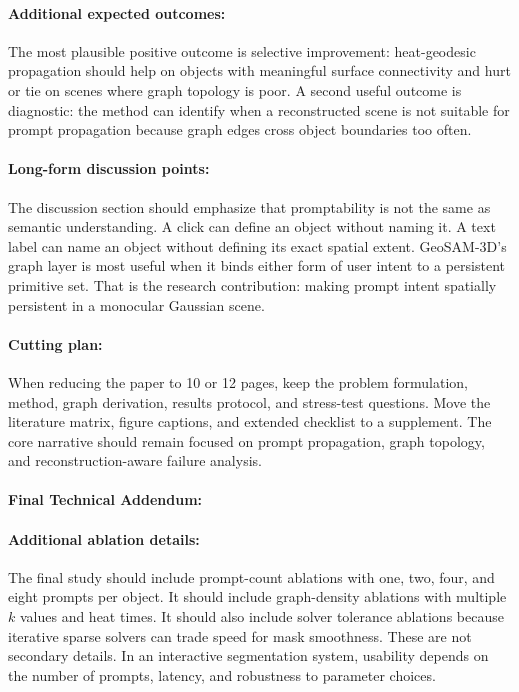 \documentclass{article}
\begin{document}
\paragraph{Additional expected outcomes:}

The most plausible positive outcome is selective improvement: heat-geodesic propagation should help on objects with meaningful surface connectivity and hurt or tie on scenes where graph topology is poor. A second useful outcome is diagnostic: the method can identify when a reconstructed scene is not suitable for prompt propagation because graph edges cross object boundaries too often.

\paragraph{Long-form discussion points:}

The discussion section should emphasize that promptability is not the same as semantic understanding. A click can define an object without naming it. A text label can name an object without defining its exact spatial extent. GeoSAM-3D's graph layer is most useful when it binds either form of user intent to a persistent primitive set. That is the research contribution: making prompt intent spatially persistent in a monocular Gaussian scene.

\paragraph{Cutting plan:}

When reducing the paper to 10 or 12 pages, keep the problem formulation, method, graph derivation, results protocol, and stress-test questions. Move the literature matrix, figure captions, and extended checklist to a supplement. The core narrative should remain focused on prompt propagation, graph topology, and reconstruction-aware failure analysis.

\paragraph{Final Technical Addendum:}

\paragraph{Additional ablation details:}

The final study should include prompt-count ablations with one, two, four, and eight prompts per object. It should include graph-density ablations with multiple $k$ values and heat times. It should also include solver tolerance ablations because iterative sparse solvers can trade speed for mask smoothness. These are not secondary details. In an interactive segmentation system, usability depends on the number of prompts, latency, and robustness to parameter choices.
\end{document}
